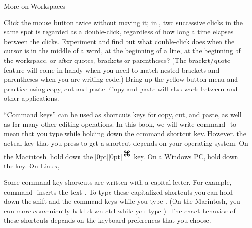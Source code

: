 \documentclass[a4paper,10pt,twoside]{book}
\begin{document}
	\renewcommand{\nnbb}[2]{} %
	\sloppy
\fi
\newcommand{\clover}{
\raisebox{-0.6ex}[0pt][0pt]{\includegraphics[width=1.4em]{cloverleafKey}}}
{More on Workspaces}


Click the mouse button twice without moving it; in \squeak, two successive clicks in the same spot is regarded as a double-click, regardless of how long a time elapses between the clicks. 
Experiment and find out what double-click does when the cursor is in the middle of a word, at the beginning of a line, at the beginning of the workspace, or after quotes, brackets or parentheses? (The bracket/quote feature will come in handy when you need to match nested brackets and parentheses when you are writing code.) Bring up the yellow button menu and practice using copy, cut and paste.  
Copy and paste will also work between \squeak and other applications.

``Command keys'' can be used as shortcuts keys for copy, cut, and paste, as well as for many other editing operations.
In this book, we will write command- to mean that you type  while holding down the command shortcut key. 
However, the actual key that you press to get a shortcut depends on your operating system. On the Macintosh, hold down the \clover{} key. 
On a Windows PC, hold down the  key.  On Linux, 

%	

Some command key shortcuts are written with a capital letter. For example, command- inserts the text . To type these capitalized shortcuts you can hold down the shift and the command keys while you type .  (On the Macintosh, you can more conveniently hold down ctrl while you type ).  The exact behavior of these shortcuts depends on the keyboard preferences that you choose.
\end{document}
